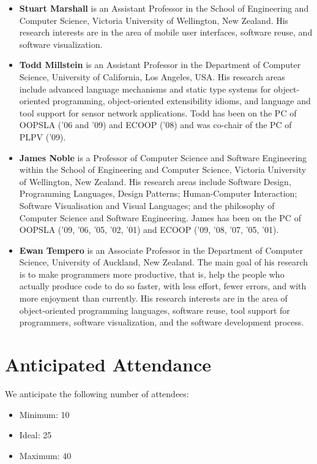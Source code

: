 \documentclass[9pt]{sigplanconf}
\begin{document}
\begin{itemize}
\item \textbf{Stuart Marshall} is an Assistant Professor in the School
  of Engineering and Computer Science, Victoria University of
  Wellington, New Zealand. His research interests are in the area of
  mobile user interfaces, software reuse, and software visualization.

\item \textbf{Todd Millstein} is an Assistant Professor in the
  Department of Computer Science, University of California, Los
  Angeles, USA. His research areas include advanced language
  mechanisms and static type systems for object-oriented programming,
  object-oriented extensibility idioms, and language and tool support
  for sensor network applications. Todd has been on the PC of OOPSLA
  ('06 and '09) and ECOOP ('08) and was co-chair of the PC of PLPV
  ('09).

\item \textbf{James Noble} is a Professor of Computer Science and
  Software Engineering within the School of Engineering and Computer
  Science, Victoria University of Wellington, New Zealand.  His
  research areas include Software Design, Programming Languages,
  Design Patterns; Human-Computer Interaction; Software Visualisation
  and Visual Languages; and the philosophy of Computer Science and
  Software Engineering. James has been on the PC of OOPSLA ('09, '06,
  '05, '02, '01) and ECOOP ('09, '08, '07, '05, '01).

\item \textbf{Ewan Tempero} is an Associate Professor in the
  Department of Computer Science, University of Auckland, New
  Zealand. The main goal of his research is to make programmers more
  productive, that is, help the people who actually produce code to do
  so faster, with less effort, fewer errors, and with more enjoyment
  than currently. His research interests are in the area of
  object-oriented programming languages, software reuse, tool support
  for programmers, software visualization, and the software
  development process.

\end{itemize}

\section{Anticipated Attendance}

We anticipate the following number of attendees:

\begin{itemize}
\item Minimum: 10 
\item Ideal: 25 
\item Maximum: 40 
\end{itemize}
\end{document}

